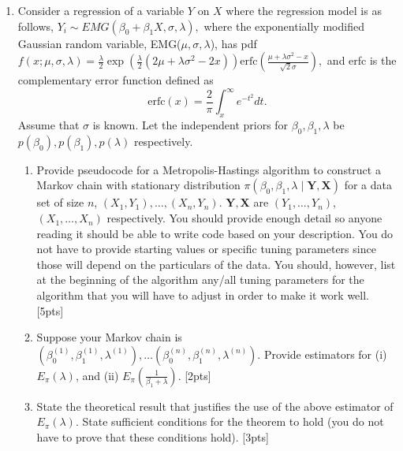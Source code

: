 \documentclass[12pt]{article}
\begin{document}
\begin{enumerate}
\newpage

\item Consider a regression of a variable $Y$ on $X$ where the regression model is as follows,
$Y_i \sim EMG(\beta_0 + \beta_1X, \sigma, \lambda),$ 
where the exponentially modified Gaussian random variable, EMG($\mu, \sigma, \lambda$), has pdf
$f(x;\mu, \sigma, \lambda) = \frac{\lambda}{2} \exp(\frac{\lambda}{2} (2\mu + \lambda\sigma^2 - 2x)) \mbox{erfc}\left(\frac{\mu + \lambda\sigma^2 - x}{\sqrt{2} \sigma} \right), $
and erfc is the complementary error function defined as
$$\mbox{erfc}(x) = \frac{2}{\pi} \int_x^{\infty} e^{-t^2} dt.$$
Assume that $\sigma$ is known. Let the independent priors for
$\beta_0, \beta_1, \lambda$ be $p(\beta_0), p(\beta_1), p(\lambda)$
respectively.
\begin{enumerate}
\item Provide pseudocode for a Metropolis-Hastings algorithm to
  construct a Markov chain with stationary distribution $\pi(\beta_0,
  \beta_1, \lambda\mid {\mathbf Y}, {\mathbf X})$ for a data set of size $n$,
  $(X_1,Y_1),\dots, (X_n,Y_n)$.  ${\mathbf Y}, {\mathbf X}$ are
 $(Y_1,\dots, Y_n)$, $(X_1,\dots, X_n)$ respectively. You should provide enough detail so
  anyone reading it should be able to write code based on your
  description. You do not have to provide starting values or specific
  tuning parameters since those will depend on the particulars of the
  data. You should, however, list at the beginning of the algorithm
  any/all tuning parameters for the algorithm that you will have to
  adjust in order to make it work well. [5pts]
\item Suppose your Markov chain is $(\beta_0 ^{(1)}, \beta_1 ^{(1)}, \lambda ^{(1)}) ,\dots
 (\beta_0^{(n)}, \beta_1 ^{(n)}, \lambda ^{(n)})$. Provide estimators for (i)
 $E_{\pi}(\lambda)$, and (ii)
  $E_{\pi}\left(\frac{1}{\beta_1 + \lambda}\right)$. [2pts]
\item State the theoretical result that justifies the use of the above
  estimator of $E_{\pi}(\lambda)$. State sufficient conditions for the theorem
  to hold (you do not have to prove that these conditions hold). [3pts]

\end{enumerate}
\end{enumerate}
\end{document}
